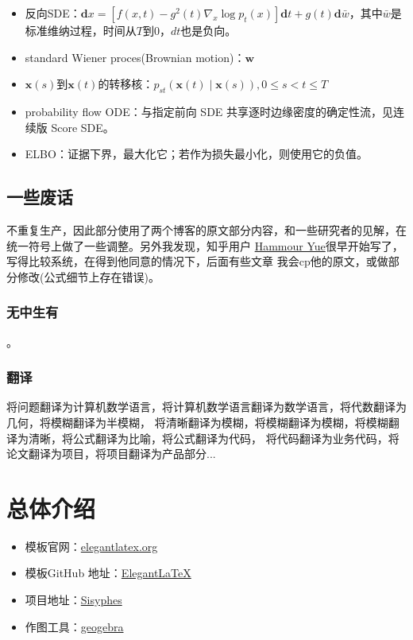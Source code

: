 \begin{itemize}
    \item 反向SDE：$\mathbf{d} x=\left[f(x, t)-g^2(t) \nabla_x \log p_t(x)\right] \mathbf{d} t+g(t) \mathbf{d} \bar{w}$，其中$\bar{w}$是标准维纳过程，时间从$T$到$0$，$dt$也是负向。
    \item standard Wiener proces(Brownian motion)：$\boldsymbol{w}$
    \item $\mathbf{x}(s)$到$\mathbf{x}(t)$的转移核：$p_{s t}(\mathbf{x}(t) \mid \mathbf{x}(s)),0 \leqslant s<t \leqslant T$
    \item probability flow ODE：与指定前向 SDE 共享逐时边缘密度的确定性流，见连续版 Score SDE。
    \item ELBO：证据下界，最大化它；若作为损失最小化，则使用它的负值。

\end{itemize}
\section{一些废话}
不重复生产，因此部分使用了两个博客的原文部分内容，和一些研究者的见解，在统一符号上做了一些调整。另外我发现，知乎用户
\href{https://www.zhihu.com/people/bai-e-ji-wan-qi}{Hammour Yue}很早开始写了，写得比较系统，在得到他同意的情况下，后面有些文章
我会cp他的原文，或做部分修改(公式细节上存在错误)。
\subsection{无中生有}
。
\subsection{翻译}
将问题翻译为计算机数学语言，将计算机数学语言翻译为数学语言，将代数翻译为几何，将模糊翻译为半模糊，
将清晰翻译为模糊，将模糊翻译为模糊，将模糊翻译为清晰，将公式翻译为比喻，将公式翻译为代码，
将代码翻译为业务代码，将论文翻译为项目，将项目翻译为产品部分...

\chapter{总体介绍}

\begin{itemize}
  \item 模板官网：\href{https://elegantlatex.org/}{elegantlatex.org}
  \item 模板GitHub 地址：\href{https://github.com/ElegantLaTeX/}{ElegantLaTeX}
  \item 项目地址：\href{https://github.com/foocker/AIGC}{Sisyphes}
  \item 作图工具：\href{https://www.geogebra.org/?lang=en}{geogebra}
\end{itemize}

